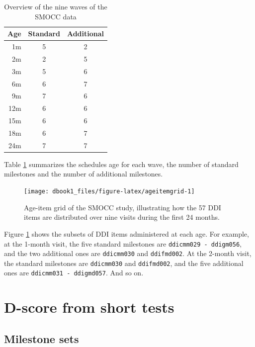 \documentclass[
]{book}
\begin{document}
\begin{table}

\caption{\label{tab:tableSMOCC}Overview of the nine waves of the SMOCC data}
\centering
\begin{tabular}[t]{rcc}
\toprule
Age & Standard & Additional\\
\midrule
1m & 5 & 2\\
2m & 2 & 5\\
3m & 5 & 6\\
6m & 6 & 7\\
9m & 7 & 6\\
\addlinespace
12m & 6 & 6\\
15m & 6 & 6\\
18m & 6 & 7\\
24m & 7 & 7\\
\bottomrule
\end{tabular}
\end{table}

Table \ref{tab:tableSMOCC} summarizes the schedules age for each wave, the number of standard milestones and the number of additional milestones.

\begin{figure}

{\centering \texttt{[image: dbook1\_files/figure-latex/ageitemgrid-1]} 

}

\caption{Age-item grid of the SMOCC study, illustrating how the 57 DDI items are distributed over nine visits during the first 24 months.}\label{fig:ageitemgrid}
\end{figure}



Figure \ref{fig:ageitemgrid} shows the subsets of DDI items administered at each age. For example, at the 1-month visit, the five standard milestones are \texttt{ddicmm029\ -\ ddigm056}, and the two additional ones are \texttt{ddicmm030} and \texttt{ddifmd002}. At the 2-month visit, the standard milestones are \texttt{ddicmm030} and \texttt{ddifmd002}, and the five additional ones are \texttt{ddicmm031\ -\ ddigmd057}. And so on.

\hypertarget{sec:comparingd}{%
\section{D-score from short tests}\label{sec:comparingd}}

\hypertarget{milestone-sets}{%
\subsection{Milestone sets}\label{milestone-sets}}
\end{document}
